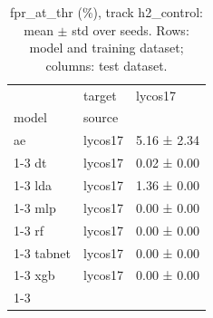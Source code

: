 \begin{table}
\caption{fpr_at_thr (\%), track h2_control: mean $\pm$ std over seeds. Rows: model and training dataset; columns: test dataset.}
\label{tab:matrix_h2_control_fpr_at_thr}
\begin{tabular}{lll}
\toprule
 & target & lycos17 \\
model & source &  \\
\midrule
ae & lycos17 & 5.16 ± 2.34 \\
\cline{1-3}
dt & lycos17 & 0.02 ± 0.00 \\
\cline{1-3}
lda & lycos17 & 1.36 ± 0.00 \\
\cline{1-3}
mlp & lycos17 & 0.00 ± 0.00 \\
\cline{1-3}
rf & lycos17 & 0.00 ± 0.00 \\
\cline{1-3}
tabnet & lycos17 & 0.00 ± 0.00 \\
\cline{1-3}
xgb & lycos17 & 0.00 ± 0.00 \\
\cline{1-3}
\bottomrule
\end{tabular}
\end{table}
